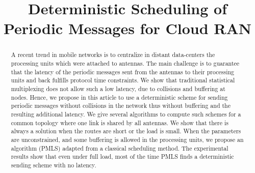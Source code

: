 \documentclass[10pt, conference, letterpaper]{IEEEtran}
\title{Deterministic Scheduling of Periodic Messages for Cloud RAN}
\author{}
\begin{document}
\maketitle

\begin{abstract}
A recent trend in mobile networks is to centralize in distant data-centers the processing units which were attached to 
antennas. The main challenge is to guarantee that the latency of the periodic messages sent from the antennas to their processing
units and back fulfills protocol time constraints. We show that traditional statistical multiplexing does not allow such a low latency, due to collisions and buffering at nodes. Hence, we propose in this article to use a deterministic scheme for sending periodic messages without collisions in the network thus without buffering and the resulting additional latency. 
We give several algorithms to compute such schemes for a common topology where one link is shared by all antennas.
We show that there is always a solution when the routes are short or the load is small. When the parameters are unconstrained,
and some buffering is allowed in the processing units, we propose an algorithm (PMLS) adapted from a classical scheduling method.
The experimental results show that even under full load, most of the time PMLS finds a deterministic sending scheme with no latency.
\end{abstract}

\end{document}
